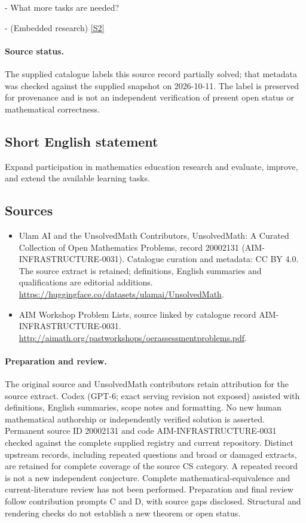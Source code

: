 \documentclass[11pt]{article}
\newcommand{\sref}[2]{\hyperlink{source:#1:#2}{[S#2]}}
\begin{document}
- What more tasks are needed?

- (Embedded research) \sref{20002131}{2}
\paragraph{Source status.}
The supplied catalogue labels this source record partially solved; that metadata was checked against the supplied snapshot on 2026-10-11. The label is preserved for provenance and is not an independent verification of present open status or mathematical correctness.
\subsection{Short English statement}
Expand participation in mathematics education research and evaluate, improve, and extend the available learning tasks.
\subsection{Sources}
\begin{itemize}
\item[\hypertarget{source:20002131:1}{S1}] Ulam AI and the UnsolvedMath Contributors, UnsolvedMath: A Curated Collection of Open Mathematics Problems, record 20002131 (AIM-INFRASTRUCTURE-0031). Catalogue curation and metadata: CC BY 4.0. The source extract is retained; definitions, English summaries and qualifications are editorial additions.
\url{https://huggingface.co/datasets/ulamai/UnsolvedMath}.
\item[\hypertarget{source:20002131:2}{S2}] AIM Workshop Problem Lists, source linked by catalogue record AIM-INFRASTRUCTURE-0031.
\url{http://aimath.org/pastworkshops/oerassessmentproblems.pdf}.
\end{itemize}
\paragraph{Preparation and review.}
The original source and UnsolvedMath contributors retain attribution for the source extract. Codex (GPT-6; exact serving revision not exposed) assisted with definitions, English summaries, scope notes and formatting. No new human mathematical authorship or independently verified solution is asserted. Permanent source ID 20002131 and code AIM-INFRASTRUCTURE-0031 checked against the complete supplied registry and current repository. Distinct upstream records, including repeated questions and broad or damaged extracts, are retained for complete coverage of the source CS category. A repeated record is not a new independent conjecture. Complete mathematical-equivalence and current-literature review has not been performed. Preparation and final review follow contribution prompts C and D, with source gaps disclosed. Structural and rendering checks do not establish a new theorem or open status.
\label{end:20002131}
\end{document}
